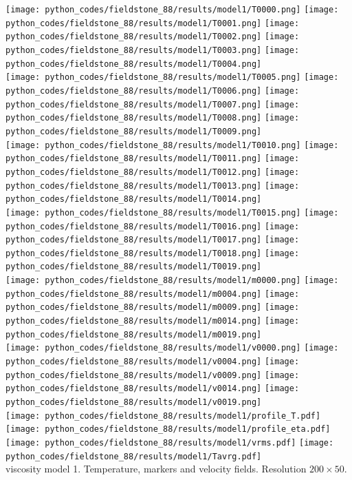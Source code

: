 \begin{center}
\texttt{[image: python\_codes/fieldstone\_88/results/model1/T0000.png]}
\texttt{[image: python\_codes/fieldstone\_88/results/model1/T0001.png]}
\texttt{[image: python\_codes/fieldstone\_88/results/model1/T0002.png]}
\texttt{[image: python\_codes/fieldstone\_88/results/model1/T0003.png]}
\texttt{[image: python\_codes/fieldstone\_88/results/model1/T0004.png]}\\
\texttt{[image: python\_codes/fieldstone\_88/results/model1/T0005.png]}
\texttt{[image: python\_codes/fieldstone\_88/results/model1/T0006.png]}
\texttt{[image: python\_codes/fieldstone\_88/results/model1/T0007.png]}
\texttt{[image: python\_codes/fieldstone\_88/results/model1/T0008.png]}
\texttt{[image: python\_codes/fieldstone\_88/results/model1/T0009.png]}\\
\texttt{[image: python\_codes/fieldstone\_88/results/model1/T0010.png]}
\texttt{[image: python\_codes/fieldstone\_88/results/model1/T0011.png]}
\texttt{[image: python\_codes/fieldstone\_88/results/model1/T0012.png]}
\texttt{[image: python\_codes/fieldstone\_88/results/model1/T0013.png]}
\texttt{[image: python\_codes/fieldstone\_88/results/model1/T0014.png]}\\
\texttt{[image: python\_codes/fieldstone\_88/results/model1/T0015.png]}
\texttt{[image: python\_codes/fieldstone\_88/results/model1/T0016.png]}
\texttt{[image: python\_codes/fieldstone\_88/results/model1/T0017.png]}
\texttt{[image: python\_codes/fieldstone\_88/results/model1/T0018.png]}
\texttt{[image: python\_codes/fieldstone\_88/results/model1/T0019.png]}\\
\texttt{[image: python\_codes/fieldstone\_88/results/model1/m0000.png]}
\texttt{[image: python\_codes/fieldstone\_88/results/model1/m0004.png]}
\texttt{[image: python\_codes/fieldstone\_88/results/model1/m0009.png]}
\texttt{[image: python\_codes/fieldstone\_88/results/model1/m0014.png]}
\texttt{[image: python\_codes/fieldstone\_88/results/model1/m0019.png]}\\
\texttt{[image: python\_codes/fieldstone\_88/results/model1/v0000.png]}
\texttt{[image: python\_codes/fieldstone\_88/results/model1/v0004.png]}
\texttt{[image: python\_codes/fieldstone\_88/results/model1/v0009.png]}
\texttt{[image: python\_codes/fieldstone\_88/results/model1/v0014.png]}
\texttt{[image: python\_codes/fieldstone\_88/results/model1/v0019.png]}\\
\texttt{[image: python\_codes/fieldstone\_88/results/model1/profile\_T.pdf]}
\texttt{[image: python\_codes/fieldstone\_88/results/model1/profile\_eta.pdf]} \\
\texttt{[image: python\_codes/fieldstone\_88/results/model1/vrms.pdf]}
\texttt{[image: python\_codes/fieldstone\_88/results/model1/Tavrg.pdf]}\\
{\captionfont viscosity model 1. Temperature, markers and velocity fields. Resolution $200\times 50$.}
\end{center}


